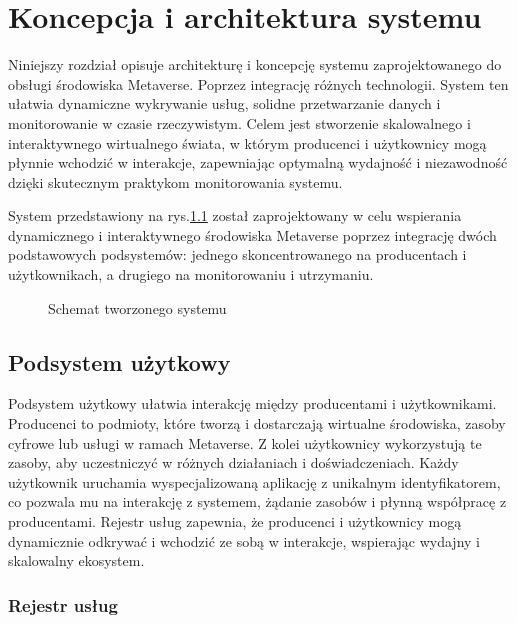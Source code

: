 \chapter{Koncepcja i architektura systemu}

Niniejszy rozdział opisuje architekturę i koncepcję systemu zaprojektowanego do obsługi środowiska Metaverse. Poprzez integrację różnych technologii. System ten ułatwia dynamiczne wykrywanie usług, solidne przetwarzanie danych i monitorowanie w czasie rzeczywistym. Celem jest stworzenie skalowalnego i interaktywnego wirtualnego świata, w którym producenci i użytkownicy mogą płynnie wchodzić w interakcje, zapewniając optymalną wydajność i niezawodność dzięki skutecznym praktykom monitorowania systemu.

System przedstawiony na rys.\ref{designedSystem} został zaprojektowany w celu wspierania dynamicznego i interaktywnego środowiska Metaverse poprzez integrację dwóch podstawowych podsystemów: jednego skoncentrowanego na producentach i użytkownikach, a drugiego na monitorowaniu i utrzymaniu.

\begin{figure}[!htbp]
    \centering
    
    \caption{Schemat tworzonego systemu}
    \label{designedSystem}
\end{figure}
\restoregeometry
\newpage


\section{Podsystem użytkowy}

Podsystem użytkowy ułatwia interakcję między producentami i użytkownikami. Producenci to podmioty, które tworzą i dostarczają wirtualne środowiska, zasoby cyfrowe lub usługi w ramach Metaverse. Z kolei użytkownicy wykorzystują te zasoby, aby uczestniczyć w różnych działaniach i doświadczeniach. Każdy użytkownik uruchamia wyspecjalizowaną aplikację z unikalnym identyfikatorem, co pozwala mu na interakcję z systemem, żądanie zasobów i płynną współpracę z producentami. Rejestr usług zapewnia, że producenci i użytkownicy mogą dynamicznie odkrywać i wchodzić ze sobą w interakcje, wspierając wydajny i skalowalny ekosystem.

\subsection{Rejestr usług}

